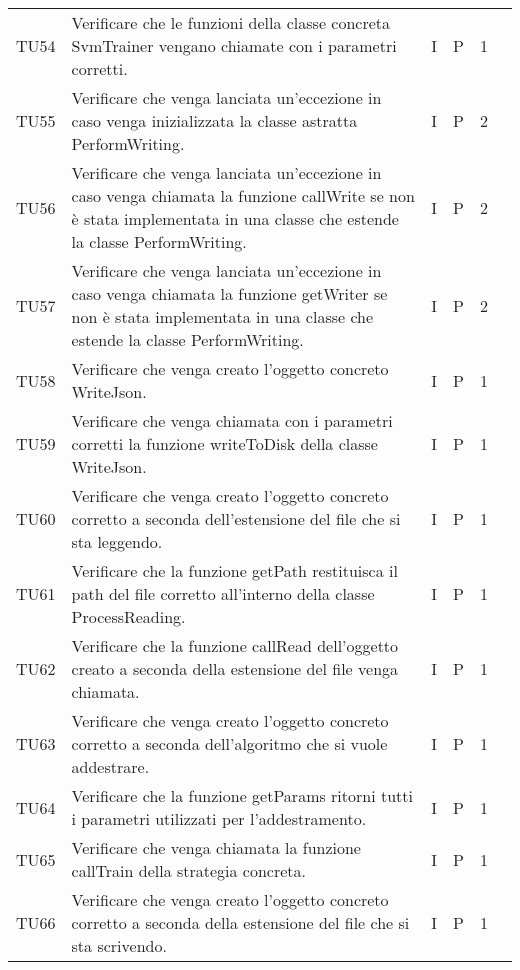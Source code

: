 \begin{longtable} {
		>{}p{12mm}
		>{}p{79.5mm}
		>{}p{9mm}
		>{}p{8mm}
		>{}p{14mm}
		>{}p{0mm}}
	TU54		& Verificare che le funzioni della classe concreta SvmTrainer vengano chiamate con i parametri corretti. & I & P & 1 & \TBstrut \\ [2mm]
	TU55		& Verificare che venga lanciata un'eccezione in caso venga inizializzata la classe astratta PerformWriting. & I & P & 2 & \TBstrut \\ [2mm]
	TU56		& Verificare che venga lanciata un'eccezione in caso venga chiamata la funzione callWrite se non è stata implementata in una classe che estende la classe PerformWriting. & I & P & 2 & \TBstrut \\ [2mm]
	TU57		& Verificare che venga lanciata un'eccezione in caso venga chiamata la funzione getWriter se non è stata implementata in una classe che estende la classe PerformWriting. & I & P & 2 & \TBstrut \\ [2mm]
	TU58		& Verificare che venga creato l'oggetto concreto WriteJson. & I & P & 1 & \TBstrut \\ [2mm]
	TU59		& Verificare che venga chiamata con i parametri corretti la funzione writeToDisk della classe WriteJson. & I & P & 1 & \TBstrut \\ [2mm]
	TU60		& Verificare che venga creato l'oggetto concreto corretto a seconda dell'estensione del file che si sta leggendo. & I & P & 1 & \TBstrut \\ [2mm]
	TU61		& Verificare che la funzione getPath restituisca il path del file corretto all'interno della classe ProcessReading. & I & P & 1 & \TBstrut \\ [2mm]
	TU62		& Verificare che la funzione callRead dell'oggetto creato a seconda della estensione del file venga chiamata. & I & P & 1 & \TBstrut \\ [2mm]
	TU63		& Verificare che venga creato l'oggetto concreto corretto a seconda dell'algoritmo che si vuole addestrare. & I & P & 1 & \TBstrut \\ [2mm]
	TU64		& Verificare che la funzione getParams ritorni tutti i parametri utilizzati per l'addestramento. & I & P & 1 & \TBstrut \\ [2mm]
	TU65		& Verificare che venga chiamata la funzione callTrain della strategia concreta. & I & P & 1 & \TBstrut \\ [2mm]
	TU66		& Verificare che venga creato l'oggetto concreto corretto a seconda della estensione del file che si sta scrivendo. & I & P & 1 & \TBstrut \\ [2mm]

\end{longtable}
